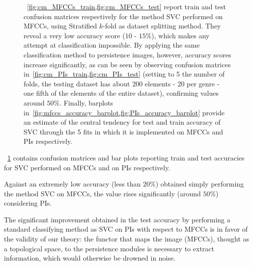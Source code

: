\documentclass[english, LaM, oneside, noexaminfo]{sapthesis}
\begin{document}
\begin{figure}[tbp]
  \caption{~\cref{fig:cm_MFCCs_train,fig:cm_MFCCs_test} report train and test confusion matrices respectively for the method SVC performed on MFCCs, using Stratified $k$-fold as dataset splitting method. They reveal a very low accuracy score ($10$ - $15\%$), which makes any attempt at classification impossible. By applying the same classification method to persistence images, however, accuracy scores increase significantly, as can be seen by observing confusion matrices in~\cref{fig:cm_PIs_train,fig:cm_PIs_test} (setting to 5 the number of folds, the testing dataset has about 200 elements - 20 per genre - one fifth of the elements of the entire dataset), confirming values around $50 \%$.
  Finally, barplots in~\cref{fig:mfccs_accuracy_barplot,fig:PIs_accuracy_barplot} provide an estimate of the central tendency for test and train accuracy of SVC through the 5 fits in which it is implemented on MFCCs and PIs respectively.}
  \label{fig:cms_barplots}
\end{figure}

~\cref{fig:cms_barplots} contains confusion matrices and bar plots reporting train and test accuracies for SVC performed on MFCCs and on PIs respectively.

 Against an extremely low accuracy (less than $20 \%$) obtained simply performing the method SVC on MFCCs, the value rises significantly (around $50 \%$) considering PIs. 

 The significant improvement obtained in the test accuracy by performing a standard classifying method as SVC on PIs with respect to MFCCs is in favor of the validity of our theory: the functor that maps the image (MFCCs), thought as a topological space, to the persistence modules is necessary to extract information, which would otherwise be drowned in noise.

\end{document}
